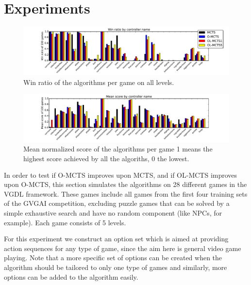 \section{Experiments}
\label{sec:experiments}
\begin{figure}
	\centering
	\includegraphics[width=\textwidth]{includes/wins}
	\vspace{-.8cm}
	\caption{Win ratio of the algorithms per game on all levels.}
	\label{fig:wins}
\end{figure}

\begin{figure}
	\centering
	\includegraphics[width=\textwidth]{includes/scores}
	\vspace{-.8cm}
	\caption{Mean normalized score of the algorithms per game 1 means the
	highest score achieved by all the algoriths, 0 the lowest.}
	\label{fig:scores}
\end{figure}

In order to test if O-MCTS improves upon MCTS, and if OL-MCTS improves upon
O-MCTS, this section simulates the algorithms on 28 different games in the VGDL
framework. These games include all games from the first four training sets of
the GVGAI competition, excluding puzzle games that can be solved by a simple
exhaustive search and have no random component (like NPCs, for example). Each
game consists of 5 levels. 

For this experiment we construct an option set which is aimed at providing
action sequences for any type of game, since the aim here is general video game
playing. Note that a more specific set of options can be created when the
algorithm should be tailored to only one type of games and similarly, more
options can be added to the algorithm easily.

